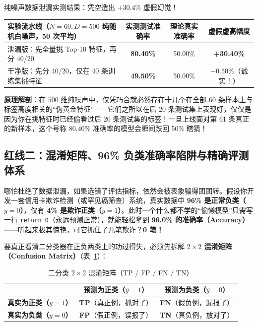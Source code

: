 \begin{failBox}{纯噪声数据泄漏实测结果：凭空造出 $+30.4\%$ 虚假幻觉！}
\begin{center}
\footnotesize
\begin{tabular}{@{}lccc@{}}
\toprule
\textbf{实验流水线（$N=60, D=500$ 纯随机白噪声，50 次平均）} & \textbf{实测测试准确率} & \textbf{理论真实准确率} & \textbf{虚假虚高幅度} \\
\midrule
泄漏版：先全量挑 Top-10 特征，再分 40/20 & \textbf{\color{ochre}80.40\%} & 50.00\% & \textbf{\color{ochre}+30.40\%} \\
干净版：先分 40/20，仅在 40 条训练集挑特征 & \textbf{\color{teal}49.50\%} & 50.00\% & $-0.50\%$（诚实！） \\
\bottomrule
\end{tabular}
\end{center}
\textbf{原理解剖}：在 $500$ 维纯噪声中，仅凭巧合就必然存在十几个在全部 60 条样本上与标签高度相关的“伪黄金特征”——它们之所以在后 20 条测试集上表现好，仅仅是因为你在挑特征时已经偷看过后 20 条测试集的标签！一旦上线面对第 61 条真正的新样本，这个号称 80.40\% 准确率的模型会瞬间跌回 50\% 瞎猜！
\end{failBox}

\subsection{红线二：混淆矩阵、96\% 负类准确率陷阱与精确评测体系}
\label{subsec:ch6-metrics}

哪怕杜绝了数据泄漏，如果选错了评估指标，依然会被表象骗得团团转。假设你开发一套信用卡欺诈检测（或罕见癌筛查）系统，真实数据中 \textbf{96\% 是正常负类（$y=0$）}，仅有 \textbf{4\% 是欺诈正类（$y=1$）}。此时一个什么都不学的“偷懒模型”只需写一行 \texttt{return 0}（永远预测正常），就能轻松拿到 \textbf{96.0\% 的准确率（Accuracy）}——听起来极其惊艳，可它抓住了几笔欺诈？\textbf{0 笔！}

要真正看清二分类器在正负两类上的功过得失，必须先拆解 \textbf{$2\times 2$ 混淆矩阵（Confusion Matrix）}（表~\ref{tab:ch6-cm}）：

\begin{table}[htbp]
\centering
\caption{二分类 $2\times 2$ 混淆矩阵（TP / FP / FN / TN）}
\label{tab:ch6-cm}
\footnotesize
\begin{tabular}{@{}lcc@{}}
\toprule
 & \textbf{预测为正类（$\hat{y} = 1$）} & \textbf{预测为负类（$\hat{y} = 0$）} \\
\midrule
\textbf{真实为正类（$y = 1$）} & \textbf{TP}（真正例，抓对了） & \textbf{FN}（假负例，漏报了） \\
\textbf{真实为负类（$y = 0$）} & \textbf{FP}（假正例，误报了） & \textbf{TN}（真负例，放对了） \\
\bottomrule
\end{tabular}
\end{table}


